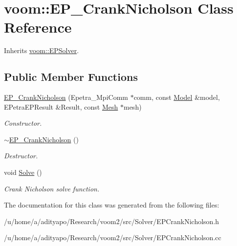 \hypertarget{classvoom_1_1_e_p___crank_nicholson}{
\section{voom::EP\_\-CrankNicholson Class Reference}
\label{classvoom_1_1_e_p___crank_nicholson}
}


Inherits \hyperlink{classvoom_1_1_e_p_solver}{voom::EPSolver}.\subsection*{Public Member Functions}
\begin{DoxyCompactItemize}
\item 
\hypertarget{classvoom_1_1_e_p___crank_nicholson_ace50b1ad14c5562491db01f2eadcd208}{
\hyperlink{classvoom_1_1_e_p___crank_nicholson_ace50b1ad14c5562491db01f2eadcd208}{EP\_\-CrankNicholson} (Epetra\_\-MpiComm $\ast$comm, const \hyperlink{classvoom_1_1_model}{Model} \&model, EPetraEPResult \&Result, const \hyperlink{classvoom_1_1_mesh}{Mesh} $\ast$mesh)}
\label{classvoom_1_1_e_p___crank_nicholson_ace50b1ad14c5562491db01f2eadcd208}

\begin{DoxyCompactList}\small\item\em Constructor. \item\end{DoxyCompactList}\item 
\hypertarget{classvoom_1_1_e_p___crank_nicholson_a3a535541446828cbbf4b0e1e8823e408}{
\hyperlink{classvoom_1_1_e_p___crank_nicholson_a3a535541446828cbbf4b0e1e8823e408}{$\sim$EP\_\-CrankNicholson} ()}
\label{classvoom_1_1_e_p___crank_nicholson_a3a535541446828cbbf4b0e1e8823e408}

\begin{DoxyCompactList}\small\item\em Destructor. \item\end{DoxyCompactList}\item 
\hypertarget{classvoom_1_1_e_p___crank_nicholson_a6be9e6e44b8fa95b085b661700eded66}{
void \hyperlink{classvoom_1_1_e_p___crank_nicholson_a6be9e6e44b8fa95b085b661700eded66}{Solve} ()}
\label{classvoom_1_1_e_p___crank_nicholson_a6be9e6e44b8fa95b085b661700eded66}

\begin{DoxyCompactList}\small\item\em Crank Nicholson solve function. \item\end{DoxyCompactList}\end{DoxyCompactItemize}


The documentation for this class was generated from the following files:\begin{DoxyCompactItemize}
\item 
/u/home/a/adityapo/Research/voom2/src/Solver/EPCrankNicholson.h\item 
/u/home/a/adityapo/Research/voom2/src/Solver/EPCrankNicholson.cc\end{DoxyCompactItemize}
